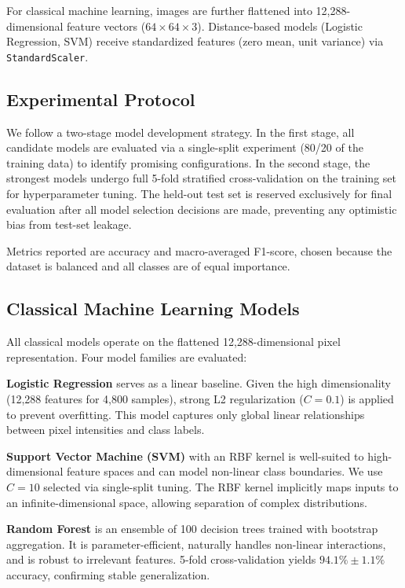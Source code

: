 \documentclass[12pt, a4paper]{article}
\begin{document}
For classical machine learning, images are further flattened into 12,288-dimensional feature vectors ($64 \times 64 \times 3$). Distance-based models (Logistic Regression, SVM) receive standardized features (zero mean, unit variance) via \texttt{StandardScaler}.

\subsection{Experimental Protocol}

We follow a two-stage model development strategy. In the first stage, all candidate models are evaluated via a single-split experiment (80/20 of the training data) to identify promising configurations. In the second stage, the strongest models undergo full 5-fold stratified cross-validation on the training set for hyperparameter tuning. The held-out test set is reserved exclusively for final evaluation after all model selection decisions are made, preventing any optimistic bias from test-set leakage.

Metrics reported are accuracy and macro-averaged F1-score, chosen because the dataset is balanced and all classes are of equal importance.

\subsection{Classical Machine Learning Models}

All classical models operate on the flattened 12,288-dimensional pixel representation. Four model families are evaluated:

\textbf{Logistic Regression} serves as a linear baseline. Given the high dimensionality (12,288 features for 4,800 samples), strong L2 regularization ($C=0.1$) is applied to prevent overfitting. This model captures only global linear relationships between pixel intensities and class labels.

\textbf{Support Vector Machine (SVM)} with an RBF kernel is well-suited to high-dimensional feature spaces and can model non-linear class boundaries. We use $C=10$ selected via single-split tuning. The RBF kernel implicitly maps inputs to an infinite-dimensional space, allowing separation of complex distributions.

\textbf{Random Forest} is an ensemble of 100 decision trees trained with bootstrap aggregation. It is parameter-efficient, naturally handles non-linear interactions, and is robust to irrelevant features. 5-fold cross-validation yields $94.1\% \pm 1.1\%$ accuracy, confirming stable generalization.
\end{document}
